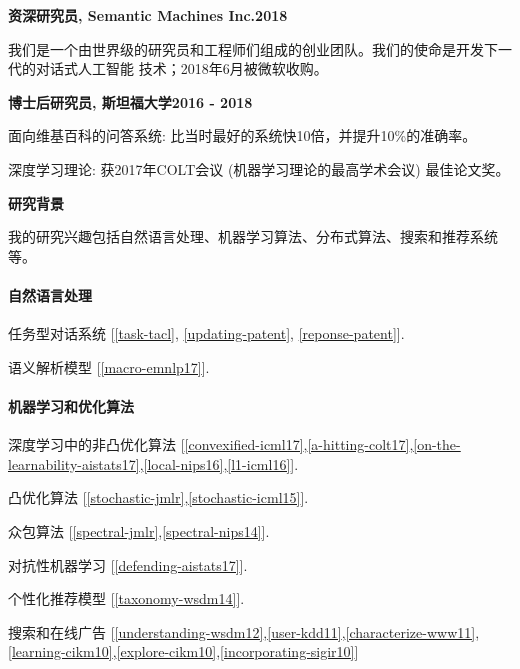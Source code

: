 \documentclass{res}
\newenvironment{my_item}{
\begin{itemize}
  \setlength{\itemsep}{0pt}
  \setlength{\parskip}{0pt}
  \setlength{\parsep}{0pt}}
{\end{itemize}
}
\begin{document}
\begin{resume}
{\bf 资深研究员,  Semantic Machines Inc.}\hfill\textbf{2018}
\begin{my_item}
\item 我们是一个由世界级的研究员和工程师们组成的创业团队。我们的使命是开发下一代的对话式人工智能
技术；2018年6月被微软收购。
\end{my_item}

{\bf 博士后研究员,  斯坦福大学}\hfill\textbf{2016 - 2018}
\begin{my_item}
\item 面向维基百科的问答系统: 比当时最好的系统快10倍，并提升10\%的准确率。
\item 深度学习理论: 获2017年COLT会议 (机器学习理论的最高学术会议) 最佳论文奖。  
\end{my_item}

{\bf\Large 研究背景}

我的研究兴趣包括自然语言处理、机器学习算法、分布式算法、搜索和推荐系统等。

\paragraph{自然语言处理}
\begin{my_item}
\item 任务型对话系统 [\ref{task-tacl}, \ref{updating-patent}, \ref{reponse-patent}].
\item 语义解析模型 [\ref{macro-emnlp17}].
\end{my_item}

\vspace{-5pt}
\paragraph{机器学习和优化算法}
\begin{my_item}
\item 深度学习中的非凸优化算法 [\ref{convexified-icml17},\ref{a-hitting-colt17},\ref{on-the-learnability-aistats17},\ref{local-nips16},\ref{l1-icml16}].
\item 凸优化算法 [\ref{stochastic-jmlr},\ref{stochastic-icml15}].
\item 众包算法 [\ref{spectral-jmlr},\ref{spectral-nips14}].
\item 对抗性机器学习 [\ref{defending-aistats17}].
\item 个性化推荐模型 [\ref{taxonomy-wsdm14}].
\item 搜索和在线广告 [\ref{understanding-wsdm12},\ref{user-kdd11},\ref{characterize-www11},\ref{learning-cikm10},\ref{explore-cikm10},\ref{incorporating-sigir10}]
\end{my_item}


\end{resume}
\end{document}
